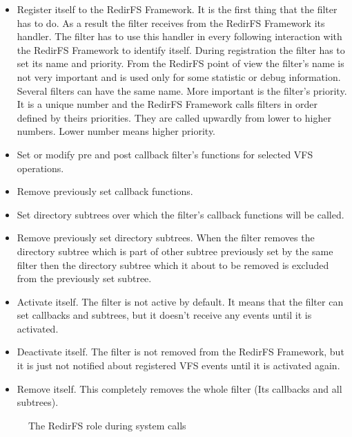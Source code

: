 \begin{itemize}
	\item Register itself to the RedirFS Framework. It is the first thing that
		the filter has to do. As a result the filter receives from the RedirFS Framework
		its handler. The filter has to use this handler in every following
		interaction with the RedirFS Framework to identify itself. During
		registration the filter has to set its name and priority. From
		the RedirFS
		point of view the filter's name is not very important and is used only
		for some statistic or debug information. Several filters can have the same
		name. More important is the filter's priority. It is a unique number and
		the RedirFS Framework calls filters in order defined by theirs priorities.
		They are called upwardly from lower to higher numbers. Lower number
		means higher priority.

	\item Set or modify pre and post callback filter's functions for selected VFS
		operations.

	\item Remove previously set callback functions.

	\item Set directory subtrees over which the filter's callback functions will
		be called.

	\item Remove previously set directory subtrees. When the filter removes
		the directory
		subtree which is part of other subtree previously set by the
		same filter then
		the directory subtree which it about to be removed is excluded from the
		previously set subtree.

	\item Activate itself. The filter is not active by default. It means
		that the filter
		can set callbacks and subtrees, but it doesn't receive any events
		until it is activated.

	\item Deactivate itself. The filter is not removed from the RedirFS Framework, but it
		is just not notified about registered VFS events until it is 
		activated again.

	\item Remove itself. This completely removes the whole filter (Its callbacks and
		all subtrees).
\end{itemize}

\begin{figure}[hp]
	\begin{center}
		
	\end{center}
	\caption{The RedirFS role during system calls}
	\label{fig:redirfs_role}
\end{figure}

